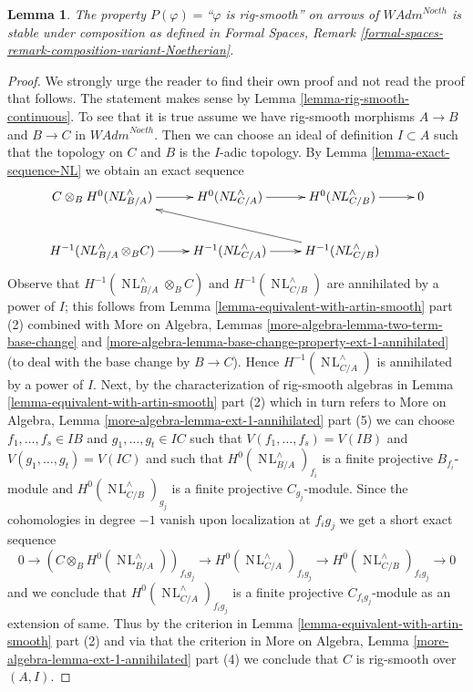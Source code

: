 \documentclass{stacks-project}
\theoremstyle{plain}
\newtheorem{lemma}[subsection]{Lemma}
\theoremstyle{definition}
\theoremstyle{remark}
\numberwithin{equation}{subsection}
\def\NL{\mathop{N\!L}\nolimits}
\begin{document}
\begin{lemma}
\label{lemma-composition-rig-smooth-continuous}
The property $P(\varphi)=$``$\varphi$ is rig-smooth''
on arrows of $\textit{WAdm}^{Noeth}$ is stable under composition
as defined in Formal Spaces, Remark
\ref{formal-spaces-remark-composition-variant-Noetherian}.
\end{lemma}

\begin{proof}
We strongly urge the reader to find their own proof and not read the proof
that follows. The statement makes sense by
Lemma \ref{lemma-rig-smooth-continuous}.
To see that it is true assume we have rig-smooth morphisms
$A \to B$ and $B \to C$ in $\textit{WAdm}^{Noeth}$.
Then we can choose an ideal of definition $I \subset A$
such that the topology on $C$ and $B$ is the $I$-adic topology.
By Lemma \ref{lemma-exact-sequence-NL} we obtain an exact sequence
$$
\xymatrix{
C \otimes_B H^0(\NL_{B/A}^\wedge) \ar[r] &
H^0(\NL_{C/A}^\wedge) \ar[r] &
H^0(\NL_{C/B}^\wedge) \ar[r] & 0 \\
H^{-1}(\NL_{B/A}^\wedge \otimes_B C) \ar[r] &
H^{-1}(\NL_{C/A}^\wedge) \ar[r] &
H^{-1}(\NL_{C/B}^\wedge) \ar[llu]
}
$$
Observe that $H^{-1}(\NL_{B/A}^\wedge \otimes_B C)$
and $H^{-1}(\NL_{C/B}^\wedge)$ are annihilated by
a power of $I$; this follows from
Lemma \ref{lemma-equivalent-with-artin-smooth} part (2)
combined with
More on Algebra, Lemmas \ref{more-algebra-lemma-two-term-base-change} and
\ref{more-algebra-lemma-base-change-property-ext-1-annihilated}
(to deal with the base change by $B \to C$).
Hence $H^{-1}(\NL_{C/A}^\wedge)$ is annihilated by a power of $I$.
Next, by the characterization of rig-smooth algebras in
Lemma \ref{lemma-equivalent-with-artin-smooth} part (2)
which in turn refers to
More on Algebra, Lemma \ref{more-algebra-lemma-ext-1-annihilated} part (5)
we can choose $f_1, \ldots, f_s \in IB$ and $g_1, \ldots, g_t \in IC$
such that $V(f_1, \ldots, f_s) = V(IB)$ and
$V(g_1, \ldots, g_t) = V(IC)$ and such that
$H^0(\NL_{B/A}^\wedge)_{f_i}$ is a finite projective $B_{f_i}$-module and
$H^0(\NL_{C/B}^\wedge)_{g_j}$ is a finite projective $C_{g_j}$-module.
Since the cohomologies in degree $-1$ vanish upon localization at
$f_ig_j$ we get a short exact sequence
$$
0 \to
(C \otimes_B H^0(\NL_{B/A}^\wedge))_{f_ig_j} \to
H^0(\NL_{C/A}^\wedge)_{f_ig_j} \to
H^0(\NL_{C/B}^\wedge)_{f_ig_j} \to 0
$$
and we conclude that $H^0(\NL_{C/A}^\wedge)_{f_ig_j}$ is a finite
projective $C_{f_ig_j}$-module as an extension of same.
Thus by the criterion in
Lemma \ref{lemma-equivalent-with-artin-smooth} part (2)
and via that the criterion in
More on Algebra, Lemma \ref{more-algebra-lemma-ext-1-annihilated} part (4)
we conclude that $C$ is rig-smooth over $(A, I)$.
\end{proof}
\end{document}
